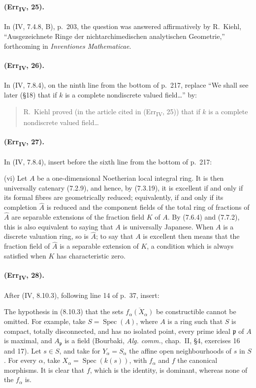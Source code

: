 \paragraph{(Err\textsubscript{IV}, 25).}
In (IV, 7.4.8, B), p.~203, the question was answered affirmatively by
R.~Kiehl, ``Ausgezeichnete Ringe der nichtarchimedischen analytischen
Geometrie,'' forthcoming in \emph{Inventiones Mathematicae}.

\paragraph{(Err\textsubscript{IV}, 26).}
In (IV, 7.8.4), on the ninth line from the bottom of p.~217, replace
``We shall see later (\S18) that if $k$ is a complete nondiscrete valued
field\ldots'' by:
\begin{quote}
R.~Kiehl proved (in the article cited in
(Err\textsubscript{IV}, 25)) that if $k$ is a complete nondiscrete
valued field\ldots
\end{quote}

\paragraph{(Err\textsubscript{IV}, 27).}
In (IV, 7.8.4), insert before the sixth line from the bottom of p.~217:

\smallskip
\noindent
\textup{(vi)} Let $A$ be a one-dimensional Noetherian local integral
ring.  It is then universally catenary (7.2.9), and hence, by (7.3.19),
it is excellent if and only if its formal fibres are geometrically
reduced; equivalently, if and only if its completion $\widehat A$ is
reduced and the component fields of the total ring of fractions of
$\widehat A$ are separable extensions of the fraction field $K$ of
$A$.  By (7.6.4) and (7.7.2), this is also equivalent to saying that
$A$ is universally Japanese.  When $A$ is a discrete valuation ring,
so is $\widehat A$; to say that $A$ is excellent then means that the
fraction field of $\widehat A$ is a separable extension of $K$, a
condition which is always satisfied when $K$ has characteristic zero.

\paragraph{(Err\textsubscript{IV}, 28).}
After (IV, 8.10.3), following line 14 of p.~37, insert:

\begin{remark}[8.10.3.1]
The hypothesis in (8.10.3) that the sets
$\overline{f_\alpha(X_\alpha)}$ be constructible cannot be omitted.
For example, take $S=\operatorname{Spec}(A)$, where $A$ is a ring such
that $S$ is compact, totally disconnected, and has no isolated point,
every prime ideal $\mathfrak p$ of $A$ is maximal, and $A_\mathfrak p$
is a field (Bourbaki, \emph{Alg. comm.}, chap.~II, \S4,
exercises 16 and 17).  Let $s\in S$, and take for
$Y_\alpha=S_\alpha$ the affine open neighbourhoods of $s$ in $S$.
For every $\alpha$, take $X_\alpha=\operatorname{Spec}(k(s))$, with
$f_\alpha$ and $f$ the canonical morphisms.  It is clear that $f$,
which is the identity, is dominant, whereas none of the $f_\alpha$ is.
\end{remark}

